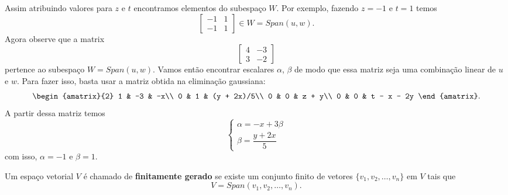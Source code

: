 \begin{exemplos}
\begin{enumerate}
\begin{solucao}
\[            \]
            Assim atribuindo valores para $z$ e $t$ encontramos elementos do subespaço $W$. Por exemplo, fazendo $z = -1$ e $t = 1$ temos
            \[
                \begin{bmatrix}-1 & 1\\-1 & 1 \end{bmatrix} \in W = Span(u, w).
            \]
            Agora observe que a matrix
            \[
                \begin{bmatrix}
                    4 & -3\\
                    3 & -2
                \end{bmatrix}
            \]
            pertence ao subespaço $W = Span(u, w)$. Vamos então encontrar escalares $\alpha$, $\beta$ de modo que essa matriz seja uma combinação linear de $u$ e $w$. Para fazer isso, basta usar a matriz obtida na eliminação gaussiana:
            \[
                \begin{amatrix}{2}
                    1 & -3 & -x\\
                    0 & 1 & (y + 2x)/5\\
                    0 & 0 & z + y\\
                    0 & 0 & t - x - 2y
                \end{amatrix}.
            \]
            A partir dessa matriz temos
            \[
                \begin{cases}
                    \alpha = -x + 3\beta\\
                    \beta = \dfrac{y + 2x}{5}
                \end{cases}
            \]
            com isso, $\alpha = -1$ e $\beta = 1$.
        \end{solucao}

    \end{enumerate}
\end{exemplos}

\begin{definicao}
    Um espaço vetorial $V$ é chamado de \textbf{finitamente gerado} se existe um conjunto finito de vetores $\{v_1, v_2, \dots, v_n\}$ em $V$ tais que
    \[
        V = Span(v_1, v_2, \dots, v_n).
    \]
\end{definicao}


